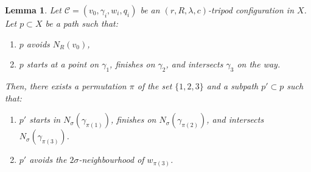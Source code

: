 \documentclass[11pt,a4paper]{amsart}
\newtheorem{lemma}[theorem]{Lemma}
\theoremstyle{definition}
\newcommand{\crosshair}{\mathcal{C}}
\begin{document}
\begin{lemma}\label{lem:good-subpath-weak}
    Let $\crosshair = (v_0,\gamma_i, w_i, q_i)$ be an $(r,R,\lambda, c)$-tripod configuration in $X$. Let $p \subset X$ be a path such that:
    \begin{enumerate}
        \item $p$ avoids $N_R(v_0)$,

        \item $p$ starts at a point on $\gamma_1$, finishes on $\gamma_2$, and intersects $\gamma_3$ on the way. 
    \end{enumerate}
    Then, there exists a permutation $\pi$ of the set $\{1,2,3\}$ and a subpath $p' \subset p$ such that:
    \begin{enumerate}
        \item $p'$ starts in $N_\sigma(\gamma_{\pi(1)})$, finishes on $N_\sigma(\gamma_{\pi(2)})$, and intersects $N_\sigma(\gamma_{\pi(3)})$.

        \item $p'$ avoids the $2\sigma$-neighbourhood of $w_{\pi(3)}$. 
    \end{enumerate}
\end{lemma}
\end{document}
